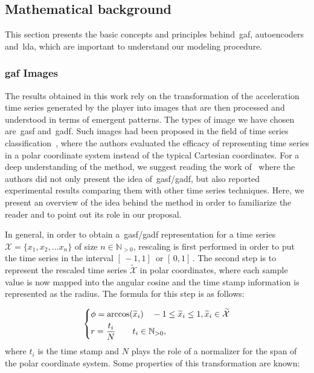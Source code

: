 \subsection{Mathematical background}
This section presents the basic concepts and principles behind~\gls{gaf}, autoencoders and~\gls{lda}, which are important to understand our modeling procedure.

\subsubsection{\glsdesc{gaf} Images}

The results obtained in this work rely on the transformation of the acceleration time series generated by the player into images that are then processed and understood in terms of emergent patterns. The types of image we have chosen are~\gls{gasf} and~\gls{gadf}. Such images had been proposed in the field of time series classification~\citep{wang_imaging_2015}, where the authors evaluated the efficacy of representing time series in a polar coordinate system instead of the typical Cartesian coordinates. For a deep understanding of the method, we suggest reading the work of~\cite{wang_imaging_2015} where the authors did not only present the idea of~\gls{gasf}/\gls{gadf}, but also reported experimental results comparing them with other time series techniques. Here, we present an overview of the idea behind the method in order to familiarize the reader and to point out its role in our proposal.

In general, in order to obtain a~\gls{gasf}/\gls{gadf} representation for a time series $\mathcal{X}=\{x_{1}, x_{2}, ... x_{n}\}$ of size $n \in \mathbb{N}_{>0}$, rescaling is first performed in order to put the time series in the interval $[\,-1,1] \,$ or $[\,0,1]\,$. The second step is to represent the rescaled time series $\widetilde{\mathcal{X}}$ in polar coordinates, where each sample value is now mapped into the angular cosine and the time stamp information is represented as the radius. 
The formula for this step is as follows:

\begin{equation}
\begin{dcases}
  \phi = \arccos(\widetilde{x}_{i}) \quad -1 \leq \widetilde{x}_{i} \leq 1, \widetilde{x}_{i} \in \widetilde{\mathcal{X}} \\
  r = \frac{t_{i}}{N} \quad \quad t_{i} \in \mathbb{N}_{>0},
\end{dcases}
\label{equation:GAF}
\end{equation} 
where $t_{i}$ is the time stamp and $N$ plays the role of a normalizer for the span of the polar coordinate system. Some properties of this transformation are known:


